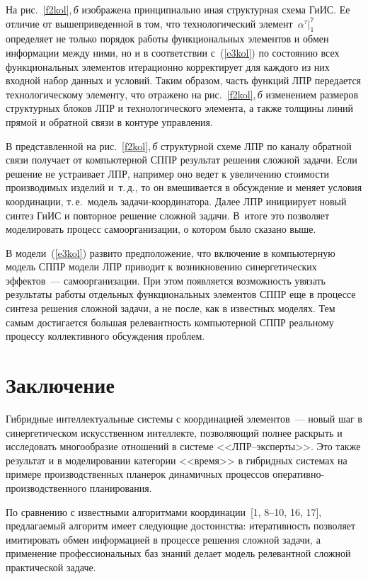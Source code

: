 \begin{multicols}{2}
  На рис.~\ref{f2kol},\,\textit{б} изображена принципиально иная структурная 
схема ГиИС. Ее отличие от вышеприведенной в том, что технологический 
элемент~$\alpha^\tau\vert_1^7$ определяет не только порядок работы 
функциональных элементов и обмен информации между ними, но и в 
соответствии с~(\ref{e3kol}) по состоянию всех функциональных элементов 
итерационно корректирует для каждого из них входной набор данных и 
условий. Таким образом, часть функций ЛПР передается технологическому 
элементу, что отражено на рис.~\ref{f2kol},\,\textit{б} изменением размеров 
структурных блоков ЛПР и технологического элемента, а также толщины 
линий прямой и обратной связи в контуре управления.
  
  В представленной на рис.~\ref{f2kol},\,\textit{б} структурной схеме ЛПР по 
каналу обратной связи получает от компьютерной СППР результат решения 
сложной задачи. Если решение не устраивает ЛПР, например оно ведет к 
увеличению стоимости производимых изделий и~т.\,д., то он вмешивается в 
обсуждение и меняет условия координации, т.\,е.\ модель задачи-координатора. 
Далее ЛПР инициирует новый синтез ГиИС и повторное решение сложной 
задачи. В~итоге это позволяет моделировать процесс самоорганизации, о 
котором было сказано выше.
  
  В модели~(\ref{e3kol}) развито предположение, что включение в 
компьютерную модель СППР модели ЛПР приводит к возникновению 
синергетических эффектов~--- самоорганизации. При этом появляется 
возможность увязать результаты работы отдельных функциональных элементов 
СППР еще в процессе синтеза решения сложной задачи, а не после, как в 
известных моделях. Тем самым достигается большая релевантность 
компьютерной \mbox{СППР} реальному процессу коллективного обсуж\-де\-ния \mbox{проблем}.
  
\section{Заключение}
  
  Гибридные интеллектуальные системы с координацией элементов~--- новый 
шаг в синергетическом искусственном интеллекте, позволяющий полнее 
раскрыть и исследовать многообразие отношений в системе 
  <<ЛПР--экс\-пер\-ты>>. Это также результат и в моделировании категории 
<<время>> в гибридных системах на примере производственных планерок 
динамичных процессов опе\-ра\-тив\-но-про\-из\-вод\-ст\-вен\-но\-го 
планирования.
  
  По сравнению с известными алгоритмами 
  координации~[1, 8--10, 16, 17], предлагаемый 
алгоритм имеет следующие достоинства: итеративность позволяет имитировать 
обмен информацией в процессе решения сложной задачи, а применение 
профессиональных баз знаний делает модель релевантной сложной 
практической задаче.
  

\end{multicols}
